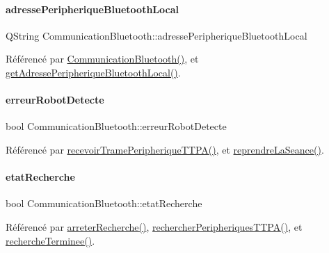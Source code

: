 \paragraph{\texorpdfstring{adresse\+Peripherique\+Bluetooth\+Local}{adressePeripheriqueBluetoothLocal}}
{\footnotesize\ttfamily Q\+String Communication\+Bluetooth\+::adresse\+Peripherique\+Bluetooth\+Local}



Référencé par \hyperlink{class_communication_bluetooth_ae1c3be7b0a32ee1142d958bad3d7c571}{Communication\+Bluetooth()}, et \hyperlink{class_communication_bluetooth_affe39c52a35aec101c04d333b6249162}{get\+Adresse\+Peripherique\+Bluetooth\+Local()}.

\mbox{\label{class_communication_bluetooth_a0ceb51c44da6c7479b46ae8e737e1541}} 
\paragraph{\texorpdfstring{erreur\+Robot\+Detecte}{erreurRobotDetecte}}
{\footnotesize\ttfamily bool Communication\+Bluetooth\+::erreur\+Robot\+Detecte}



Référencé par \hyperlink{class_communication_bluetooth_ae50bbbf70a5afdea0a0c4d3322e90e40}{recevoir\+Trame\+Peripherique\+T\+T\+P\+A()}, et \hyperlink{class_communication_bluetooth_a1bcf85f34d2902ba6fe3b6929b409272}{reprendre\+La\+Seance()}.

\mbox{\label{class_communication_bluetooth_a9e252653d4d3c6fa9c772b35bf0eb02f}} 
\paragraph{\texorpdfstring{etat\+Recherche}{etatRecherche}}
{\footnotesize\ttfamily bool Communication\+Bluetooth\+::etat\+Recherche}



Référencé par \hyperlink{class_communication_bluetooth_ab9993bd24a2f0c8254564a36cdf16069}{arreter\+Recherche()}, \hyperlink{class_communication_bluetooth_a4c2e2d557728c227faeb247cb8a9c482}{rechercher\+Peripheriques\+T\+T\+P\+A()}, et \hyperlink{class_communication_bluetooth_a79ee5a5bcaaf265048f1213b5504f146}{recherche\+Terminee()}.

